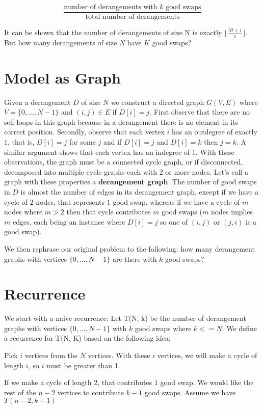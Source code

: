 \documentclass[12pt]{article}
\begin{document}
\[ \frac{\text{number of derangements with $k$ good swaps}}{\text{total number of derangements}} \]

It can be shown that the number of derangements of size N is exactly $\lfloor \frac{N! + 1}{e} \rfloor$.
But how many derangements of size $N$ have $K$ good swaps?


\section{Model as Graph}
Given a derangement $D$ of size $N$ we construct a directed graph $G(V, E)$ where $V = \{0, ..., N - 1\}$
and $(i, j) \in E$ if $D[i] = j$. First observe that there are no self-loops in this graph because in 
a derangement there is no element in its correct position. Secondly, observe that each vertex $i$ has an outdegree
of exactly $1$, that is, $D[i] = j$ for some $j$ and if $D[i] = j$ and $D[i] = k$ then $j = k$. A similar argument shows that each
vertex has an indegree of $1$. With these observations, the graph must be a connected cycle graph, or if
disconnected, decomposed into multiple cycle graphs each with 2 or more nodes.
Let's call a graph with these properties a \textbf{derangement graph}.
The number of good swaps in $D$ is almost the number of edges in its derangement graph, except if we have a cycle of $2$ nodes,
that represents $1$ good swap, whereas if we have a cycle of $m$ nodes where $m > 2$ then that cycle contributes
$m$ good swaps ($m$ nodes implies $m$ edges, each being an instance where $D[i] = j$ so one of $(i, j)$ or 
$(j, i)$ is a good swap).

We then rephrase our original problem to the following: how many derangement graphs with
vertices $\{0, ..., N - 1\}$ are there with $k$ good swaps?

\section{Recurrence}
We start with a naive recurrence:
Let T(N, k) be the number of derangement graphs with vertices $\{0, ..., N - 1\}$ with $k$ good swaps where
$k <= N$.
We define a recurrence for T(N, K) based on the following idea:

Pick $i$ vertices from the $N$ vertices. With these $i$ vertices, we will make a cycle of length $i$, so $i$ must be greater than 1.

If we make a cycle of length $2$, that contributes $1$ good swap.
We would like the rest of the $n - 2$ vertices to contribute $k - 1$
good swaps. Assume we have $T(n - 2, k - 1)$
\end{document}
